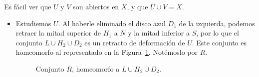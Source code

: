 \documentclass[12pt]{article}
\begin{document}
\begin{ejercicio}[2 puntos]
        Es fácil ver que $U$ y $V$ son abiertos en $X$, y que $U\cup V = X$.
        \begin{itemize}
            \item Estudiemos $U$. Al haberle eliminado el disco azul $D_1$ de la izquierda, podemos retraer la mitad superior de $H_1$ a $N$ y la mitad inferior a $S$, por lo que el conjunto $L\cup H_2\cup D_2$ es un retracto de deformación de $U$. Este conjunto es homeomorfo al representado en la Figura~\ref{fig:retracto}. Notémoslo por $R$.
            \begin{figure}[h]
                \centering
                \caption{Conjunto $R$, homeomorfo a $L\cup H_2\cup D_2$.}
                \label{fig:retracto}
            \end{figure}


\end{itemize}
\end{ejercicio}
\end{document}
